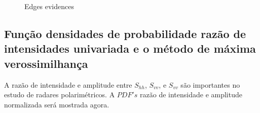 \documentclass[remotesensing,article,submit,moreauthors,pdftex]{Definitions/mdpi}
\begin{document}
\begin{figure}[hbt]
	\centering
     \caption{Edges evidences}
     \label{evidencias_hh_hv_vv}
   \end{figure}


\subsection{Função densidades de probabilidade razão de intensidades univariada e o método de máxima verossimilhança}
A razão de intensidade e amplitude entre $S_{hh}$, $S_{vv}$, e $S_{vv}$ são importantes no estudo de radares polarimétricos. A $PDF's$ razão de intensidade e amplitude normalizada será mostrada agora. 
\end{document}
